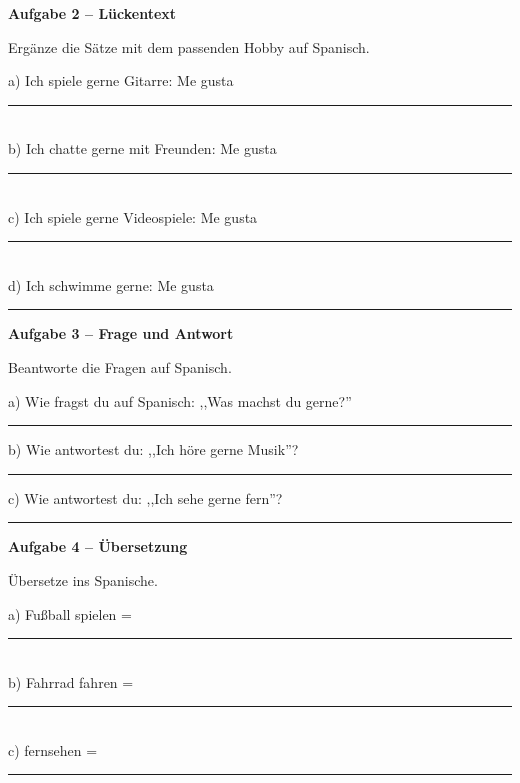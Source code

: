 \documentclass[11pt, a4paper]{article}
\newcommand{\fachfarbe}{spanisch}
\newcommand{\punktebox}[1]{\hfill\fbox{\small \_/#1}}
\newcommand{\luecke}[1]{\rule{#1}{0.4pt}}
\newenvironment{aufgabe}[1]{%
    \needspace{5\baselineskip}%
    \nopagebreak[4]%
    \vspace{10pt}
    \noindent\textbf{\textcolor{\fachfarbe}{Aufgabe #1}}
    \nopagebreak[4]%
    \vspace{5pt}
    \nopagebreak[4]%
    \begin{list}{}{\leftmargin=0pt}
    \item[]
}{%
    \end{list}
}
\begin{document}

\begin{aufgabe}{2 -- Lückentext}
Ergänze die Sätze mit dem passenden Hobby auf Spanisch. \punktebox{8}
\end{aufgabe}

\noindent
a) Ich spiele gerne Gitarre: Me gusta \luecke{5cm}\\[1em]
b) Ich chatte gerne mit Freunden: Me gusta \luecke{5cm}\\[1em]
c) Ich spiele gerne Videospiele: Me gusta \luecke{5cm}\\[1em]
d) Ich schwimme gerne: Me gusta \luecke{5cm}

\vspace{15pt}


\begin{aufgabe}{3 -- Frage und Antwort}
Beantworte die Fragen auf Spanisch. \punktebox{6}
\end{aufgabe}

\noindent
a) Wie fragst du auf Spanisch: ,,Was machst du gerne?''

\luecke{10cm}

\vspace{1em}

\noindent
b) Wie antwortest du: ,,Ich höre gerne Musik''?

\luecke{10cm}

\vspace{1em}

\noindent
c) Wie antwortest du: ,,Ich sehe gerne fern''?

\luecke{10cm}

\vspace{15pt}


\begin{aufgabe}{4 -- Übersetzung}
Übersetze ins Spanische. \punktebox{6}
\end{aufgabe}

\noindent
a) Fußball spielen = \luecke{6cm}\\[1em]
b) Fahrrad fahren = \luecke{6cm}\\[1em]
c) fernsehen = \luecke{6cm}
\end{document}
